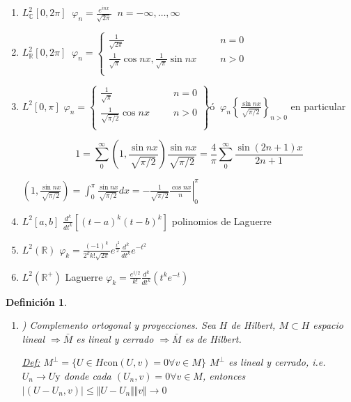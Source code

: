 \documentclass[a4paper,10pt]{book}
\newtheorem{definition}{Definición}
\begin{document}
\begin{enumerate}
    
    \item $L^2_{\mathbb{C}} [ 0 , 2\pi] \;\;  \varphi_n=\frac{e^{inx}}{\sqrt{2\pi}} \;\; n=-\infty,\ldots,\infty$
    \item  $L^2_{\mathbb{R}} [ 0 , 2\pi] \;\;
 \varphi_n  = \left\{\begin{aligned}
       \frac{1}{ \sqrt{2\pi} }   &\;\;\;&  n= 0 \\
        \frac{1}{\sqrt{\pi}} \cos n x , \frac{1}{\sqrt{\pi}} \sin n x &\;\;\;&  n>0\\
       \end{aligned}
 \right. $
 \item $L^2[0,\pi]$
  $\varphi_n  = \left\{\begin{aligned}
       \frac{1}{ \sqrt{\pi} }   &\;\;\;&  n= 0 \\
        \frac{1}{\sqrt{\pi/2}} \cos n x &\;\;\;&  n>0\\
       \end{aligned}
 \right\}  \text{ó} \;\; \varphi_n \left\{ \frac{\sin nx}{\sqrt{\pi/2}} \right\}_{n>0} $
 en particular

 \[1=\sum\limits_0^\infty \left( 1,\frac{\sin n x}{ \sqrt{\pi/2}} \right) \frac{\sin nx }{\sqrt{\pi/2}} = \frac{4}{\pi} \sum_0^\infty \frac{\sin (2n+1)x}{2n+1}\]

  $\left( 1,\frac{\sin n x}{ \sqrt{\pi/2}} \right) = \int_0^\pi \frac{\sin n x}{ \sqrt{\pi/2}}  dx = \left.-\frac{1}{ \sqrt{\pi/2}} \frac{\cos nx}{n}\right|_0^\pi$

  \item $L^2 [a,b]$  $\frac{d^k}{dt^k} \left[ (t-a)^k (t-b)^k\right]$ polinomios de Laguerre 
  \item $L^2(\mathbb{R} )$  $\varphi_k =\frac{(-1)^k}{ 2^k k! \sqrt{2\pi}}  e^{\frac{t^2}{2} } \frac{d^k}{ dt^k} e^{-t^2}$   
  \item $L^2(\mathbb{R}^+ )$ Laguerre  $\varphi_k = \frac{e^{t/2}}{ k!} \frac{d^k }{dt^k} (t^k e^{-t})$
 \end{enumerate}


 \begin{definition}
\begin{enumerate}[label=\alph*]

\item) Complemento ortogonal y proyecciones. Sea $H$ de Hilbert, $M \subset H$ espacio lineal $\Rightarrow \bar{M}$ es lineal
y cerrado $\Rightarrow \bar{M} $ es de Hilbert.

\underline{Def:} $M^\perp = \{ U\in H \text{con} (U,v) = 0 \forall v\in M\}$
$M^\perp$ es lineal y cerrado, i.e.  $U_n\rightarrow U \text{y}$ donde cada $(U_n,v)=0 \forall v\in M$,
entonces
$|(U-U_n,v) |\leq \Vert U-U_n\Vert \Vert v\Vert \rightarrow 0$

\end{enumerate}
\end{definition}
\end{document}
